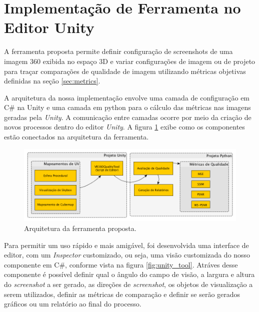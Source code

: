 \documentclass[conference]{IEEEtran}
\begin{document}

\section{Implementação de Ferramenta no Editor Unity}  \label{sec:unitytool}

A ferramenta proposta permite definir configuração de screenshots de uma imagem 360 exibida no espaço 3D e variar configurações de imagem ou de projeto para traçar comparações de qualidade de imagem utilizando métricas objetivas definidas na seção \ref{sec:metrics}.

A arquitetura da nossa implementação envolve uma camada de configuração em C\# na Unity e uma camada em python para o cálculo das métricas nas imagens geradas pela \textit{Unity}. A comunicação entre camadas ocorre por meio da criação de novos processos dentro do editor \textit{Unity}. A figura \ref{fig:toolarch} exibe como os componentes estão conectados na arquitetura da ferramenta.

\begin{figure}[ht]
\centering
\includegraphics[width=\textwidth]{../images/tool_arch.png}
\caption{Arquitetura da ferramenta proposta.}
\label{fig:toolarch}
\end{figure}

Para permitir um uso rápido e mais amigável, foi desenvolvida uma interface de editor, com um \textit{Inspector} customizado, ou seja, uma visão customizada do nosso componente em C\#, conforme vista na figura \ref{fig:unity_tool}. Atráves desse componente é possível definir qual o ângulo do campo de visão, a largura e altura do \textit{screenshot} a ser gerado, as direções de \textit{screenshot}, os objetos de visualização a serem utilizados, definir as métricas de comparação e definir se serão gerados gráficos ou um relatório ao final do processo.
\end{document}
